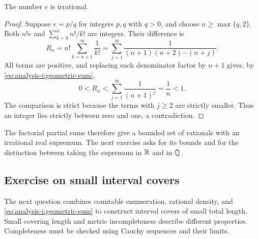 \begin{proposition}
  \label{thm:analysis-i:e-irrational}
  The number $e$ is irrational.
\end{proposition}
\begin{proof}
  Suppose $e=p/q$ for integers $p,q$ with $q>0$, and choose
  $n\geq\max\{q,2\}$. Both $n!e$ and $\sum_{k=0}^{n}n!/k!$ are integers.
  Their difference is
  \[
    R_n=n!\sum_{k=n+1}^{\infty}\frac1{k!}
       =\sum_{j=1}^{\infty}
         \frac1{(n+1)(n+2)\cdots(n+j)}.
  \]
  All terms are positive, and replacing each denominator factor by $n+1$
  gives, by \autoref{eq:analysis-i:geometric-sum},
  \[
    0<R_n<\sum_{j=1}^{\infty}\frac1{(n+1)^j}
          =\frac1n<1.
  \]
  The comparison is strict because the terms with $j\geq2$ are strictly
  smaller. Thus an integer lies strictly between zero and one, a
  contradiction.
\end{proof}
The factorial partial sums therefore give a bounded set of rationals
with an irrational real supremum. The next exercise asks for its bounds
and for the distinction between taking the supremum in $\mathbb{R}$ and in $\mathbb{Q}$.



\subsection{Exercise on small interval covers}
The next question combines countable enumeration, rational density, and
\autoref{eq:analysis-i:geometric-sum} to construct interval covers
of small total length. Small covering length and metric incompleteness
describe different properties. Completeness must be checked using Cauchy
sequences and their limits.


